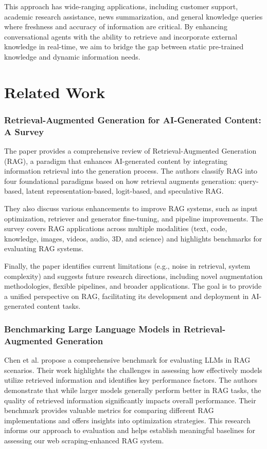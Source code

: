 \documentclass[fleqn,moreauthors,10pt]{ds_report}
\begin{document}
This approach has wide-ranging applications, including customer support, academic research assistance, news summarization, and general knowledge queries where freshness and accuracy of information are critical. By enhancing conversational agents with the ability to retrieve and incorporate external knowledge in real-time, we aim to bridge the gap between static pre-trained knowledge and dynamic information needs.  
  
\textbf{}  
  
\section*{Related Work}  
  
\subsubsection{Retrieval-Augmented Generation for AI-Generated Content: A Survey}  
The paper provides a comprehensive review of Retrieval-Augmented Generation (RAG), a paradigm that enhances AI-generated content by integrating information retrieval into the generation process. The authors classify RAG into four foundational paradigms based on how retrieval augments generation: query-based, latent representation-based, logit-based, and speculative RAG.   
  
They also discuss various enhancements to improve RAG systems, such as input optimization, retriever and generator fine-tuning, and pipeline improvements. The survey covers RAG applications across multiple modalities (text, code, knowledge, images, videos, audio, 3D, and science) and highlights benchmarks for evaluating RAG systems.  
  
Finally, the paper identifies current limitations (e.g., noise in retrieval, system complexity) and suggests future research directions, including novel augmentation methodologies, flexible pipelines, and broader applications. The goal is to provide a unified perspective on RAG, facilitating its development and deployment in AI-generated content tasks. \cite{zhao2024}  
  
\subsubsection{Benchmarking Large Language Models in Retrieval-Augmented Generation}  
Chen et al. propose a comprehensive benchmark for evaluating LLMs in RAG scenarios. Their work highlights the challenges in assessing how effectively models utilize retrieved information and identifies key performance factors. The authors demonstrate that while larger models generally perform better in RAG tasks, the quality of retrieved information significantly impacts overall performance. Their benchmark provides valuable metrics for comparing different RAG implementations and offers insights into optimization strategies. This research informs our approach to evaluation and helps establish meaningful baselines for assessing our web scraping-enhanced RAG system. \cite{chen2024}  
  
\end{document}
